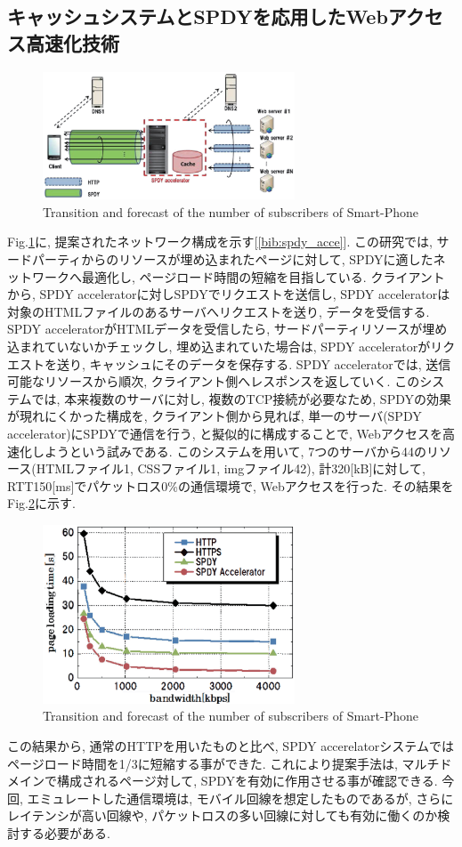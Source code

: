 \documentclass[twocolumn]{jsarticle}
\begin{document}
\subsection{キャッシュシステムとSPDYを応用したWebアクセス高速化技術}
\begin{figure}[h]
  \centering
  \includegraphics[width=7.5cm]{eps/http_acc_dia.eps}
  \caption{Transition and forecast of the number of subscribers of Smart-Phone}
  \label{fig:ongoing2}
\end{figure}
Fig.\ref{fig:ongoing2}に, 提案されたネットワーク構成を示す[\ref{bib:spdy_acce}].
この研究では, サードパーティからのリソースが埋め込まれたページに対して, SPDYに適したネットワークへ最適化し,
ページロード時間の短縮を目指している.
クライアントから, SPDY acceleratorに対しSPDYでリクエストを送信し, SPDY
acceleratorは対象のHTMLファイルのあるサーバへリクエストを送り, データを受信する.
SPDY acceleratorがHTMLデータを受信したら, サードパーティリソースが埋め込まれていないかチェックし, 埋め込まれていた場合は, SPDY
acceleratorがリクエストを送り, キャッシュにそのデータを保存する.
SPDY acceleratorでは, 送信可能なリソースから順次, クライアント側へレスポンスを返していく.
このシステムでは, 本来複数のサーバに対し, 複数のTCP接続が必要なため, SPDYの効果が現れにくかった構成を, クライアント側から見れば,
単一のサーバ(SPDY accelerator)にSPDYで通信を行う, と擬似的に構成することで, Webアクセスを高速化しようという試みである.
このシステムを用いて, 7つのサーバから44のリソース(HTMLファイル1, CSSファイル1,
imgファイル42), 計320[kB]に対して,
RTT150[ms]でパケットロス0\%の通信環境で, Webアクセスを行った.
その結果をFig.\ref{fig:ongoing22}に示す.
\begin{figure}[h]
  \centering
  \includegraphics[width=7.5cm]{eps/http_acc_graph.eps}
  \caption{Transition and forecast of the number of subscribers of Smart-Phone}
  \label{fig:ongoing22}
\end{figure}
この結果から, 通常のHTTPを用いたものと比べ, SPDY accerelatorシステムではページロード時間を1/3に短縮する事ができた.
これにより提案手法は, マルチドメインで構成されるページ対して, SPDYを有効に作用させる事が確認できる.
今回, エミュレートした通信環境は, モバイル回線を想定したものであるが, さらにレイテンシが高い回線や,
パケットロスの多い回線に対しても有効に働くのか検討する必要がある.
\end{document}

